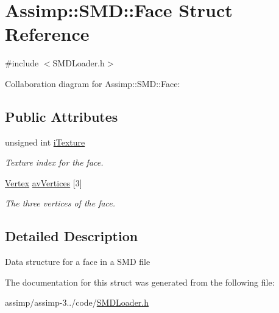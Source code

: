 \hypertarget{struct_assimp_1_1_s_m_d_1_1_face}{\section{Assimp\+:\+:S\+M\+D\+:\+:Face Struct Reference}
\label{struct_assimp_1_1_s_m_d_1_1_face}
}


{\ttfamily \#include $<$S\+M\+D\+Loader.\+h$>$}



Collaboration diagram for Assimp\+:\+:S\+M\+D\+:\+:Face\+:
\subsection*{Public Attributes}
\begin{DoxyCompactItemize}
\item 
\hypertarget{struct_assimp_1_1_s_m_d_1_1_face_a0d4fea84205bd0be71974caac9377092}{unsigned int \hyperlink{struct_assimp_1_1_s_m_d_1_1_face_a0d4fea84205bd0be71974caac9377092}{i\+Texture}}\label{struct_assimp_1_1_s_m_d_1_1_face_a0d4fea84205bd0be71974caac9377092}

\begin{DoxyCompactList}\small\item\em Texture index for the face. \end{DoxyCompactList}\item 
\hypertarget{struct_assimp_1_1_s_m_d_1_1_face_a89778613051d40420821c3637e7cfdb1}{\hyperlink{struct_assimp_1_1_s_m_d_1_1_vertex}{Vertex} \hyperlink{struct_assimp_1_1_s_m_d_1_1_face_a89778613051d40420821c3637e7cfdb1}{av\+Vertices} \mbox{[}3\mbox{]}}\label{struct_assimp_1_1_s_m_d_1_1_face_a89778613051d40420821c3637e7cfdb1}

\begin{DoxyCompactList}\small\item\em The three vertices of the face. \end{DoxyCompactList}\end{DoxyCompactItemize}


\subsection{Detailed Description}
Data structure for a face in a S\+M\+D file 

The documentation for this struct was generated from the following file\+:\begin{DoxyCompactItemize}
\item 
assimp/assimp-\/3../code/\hyperlink{_s_m_d_loader_8h}{S\+M\+D\+Loader.\+h}\end{DoxyCompactItemize}
